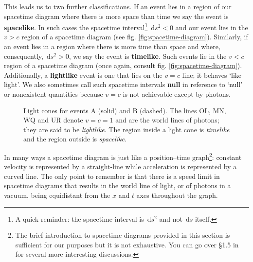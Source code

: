 \documentclass[english,seminar]{lecture}
\newcommand{\diff}{\,\textrm{d}}
\begin{document}
This leads us to two further classifications. If an event lies in a region of our spacetime diagram where there is more space than time we say the event is \textbf{spacelike}. In such cases the spacetime interval\footnote{A quick reminder: the spacetime interval is $\diff s^2$ and not $\diff s$ itself.} $\diff s^2 < 0$ and our event lies in the $v > c$ region of a spacetime diagram (see fig. \ref{fig:spacetime-diagram}). Similarly, if an event lies in a region where there is more time than space and where, consequently, $\diff s^2 > 0$, we say the event is \textbf{timelike}. Such events lie in the $v < c$ region of a spacetime diagram (once again, consult fig. \ref{fig:spacetime-diagram}). Additionally, a \textbf{lightlike} event is one that lies on the $v = c$ line; it behaves `like light'. We also sometimes call such spacetime intervals \textbf{null} in reference to `null' or nonexistent quantities because $v=c$ is not achievable except by photons.

\begin{figure}[H]
\vspace*{0.25cm}
\centering
	\caption{Light cones for events A (solid) and B (dashed). The lines OL, MN, WQ and UR denote $v=c=1$ and are the world lines of photons; they are said to be \textit{lightlike}. The region inside a light cone is \textit{timelike} and the region outside is \textit{spacelike}.}\label{fig:light-cones}
\end{figure}

In many ways a spacetime diagram is just like a position--time graph\footnote{The brief introduction to spacetime diagrams provided in this section is sufficient for our purposes but it is not exhaustive. You can go over \S1.5 in \cite{schutz} for several more interesting discussions.}: constant velocity is represented by a straight-line while acceleration is represented by a curved line. The only point to remember is that there is a speed limit in spacetime diagrams that results in the world line of light, or of photons in a vacuum, being equidistant from the $x$ and $t$ axes throughout the graph.
\end{document}
